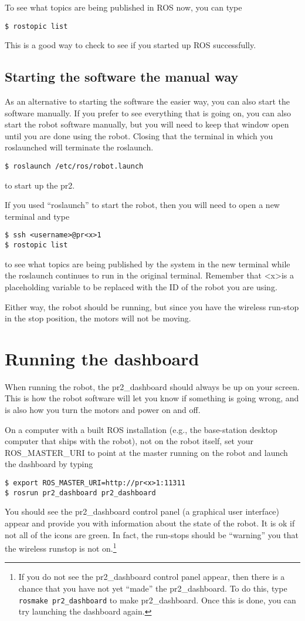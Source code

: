 To see what topics are being published in ROS now, you can type 
\begin{verbatim}
$ rostopic list
\end{verbatim}
This is a good way to check to see if you started up ROS successfully.

\subsection{Starting the software the manual way}
As an alternative to starting the software the easier way, you can also start the software manually. If you prefer to see everything that is going on, you can also start the robot software manually, but you will need to keep that 
window open until you are done using the robot. Closing that the terminal in which you roslaunched will terminate the roslaunch.
\begin{verbatim}
$ roslaunch /etc/ros/robot.launch
\end{verbatim}
to start up the pr2.  

If you used ``roslaunch'' to start the robot, then you will need to open a new terminal and type
\begin{verbatim}
$ ssh <username>@pr<x>1
$ rostopic list
\end{verbatim}
to see what topics are being published by the system in the new terminal while the roslaunch continues to run in the 
original terminal. Remember that \textless x\textgreater is a placeholding variable to be replaced with the ID of the robot you are using.

Either way, the robot should be running, but since you have the wireless run-stop in the stop position, the motors will not be moving.  

\section{Running the dashboard}
When running the robot, the pr2\_dashboard should always be up on your screen.  This is how the robot software will 
let you know if something is going wrong, and is also how you turn the motors and power on and off.  

On a computer with a built ROS installation (e.g., the base-station desktop computer that ships with the robot), not on the robot itself, set your ROS\_MASTER\_URI to point at the master running on the robot and launch the dashboard by typing
\begin{verbatim}
$ export ROS_MASTER_URI=http://pr<x>1:11311
$ rosrun pr2_dashboard pr2_dashboard
\end{verbatim}
You should see the pr2\_dashboard control panel (a graphical user interface) appear and provide you with information about the state of the robot. It is ok if not all of the icons are green. In fact, the run-stops should be ``warning'' you that the wireless runstop is not on.\footnote{If you do not see the pr2\_dashboard control panel appear, then there is a chance that you have not yet ``made'' the pr2\_dashboard. 
To do this, type \texttt{rosmake pr2\_dashboard} to make pr2\_dashboard. Once this is done, you can try launching the dashboard again.}

